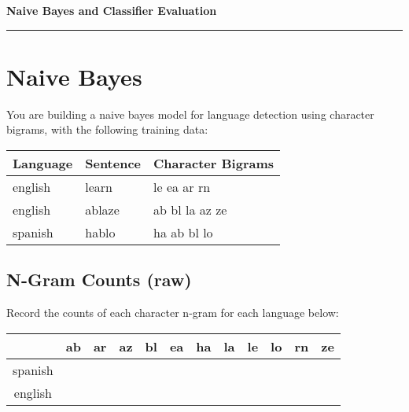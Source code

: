 \documentclass{article}
\newcommand{\worksheetname}{Naive Bayes and Classifier Evaluation}
\begin{document}
{\Large\textbf{\worksheetname}}\\\rule{\linewidth}{0.5mm}

\section{Naive Bayes}
You are building a naive bayes model for language detection using character bigrams, with the following training data:

\begin{table}[!ht]
\large
    \centering
    \begin{tabular}{|l|l|l|}
    \hline
        Language & Sentence & Character Bigrams \\ \hline
        english & learn & le ea ar rn \\ \hline
        english & ablaze & ab bl la az ze \\ \hline
        spanish & hablo & ha ab bl lo \\ \hline
    \end{tabular}
\end{table}

\subsection{N-Gram Counts (raw)}
Record the counts of each character n-gram for each language below:

\begin{table}[!ht]
\large
    \centering
    \begin{tabular}{|c|c|c|c|c|c|c|c|c|c|c|c|}
    \hline
         &  ab&  ar&  az&  bl&  ea&  ha&  la&  le&  lo&rn &ze\\ \hline
         \multirow{ 2}{*}{spanish}& \hspace{.35in} & \hspace{.35in} & \hspace{.35in} & \hspace{.35in} & \hspace{.35in} & \hspace{.35in} & \hspace{.35in} &\hspace{.35in}  & \hspace{.35in} & \hspace{.35in} & \hspace{.35in} \\ 
         &  &  &  &  &  &  &  &  &  & &\\ \hline
         \multirow{ 2}{*}{english}&  &  &  &  &  &  &  &  &  & &\\ 
         &  &  &  &  &  &  &  &  &  & &\\ 
    \hline
    \end{tabular}
\end{table}
\end{document}
